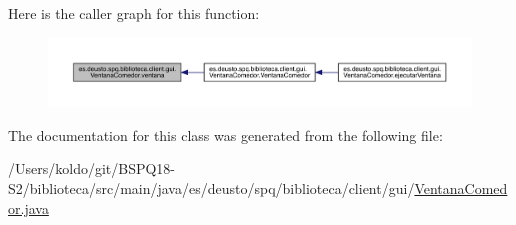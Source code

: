 Here is the caller graph for this function\+:
\nopagebreak
\begin{figure}[H]
\begin{center}
\leavevmode
\includegraphics[width=350pt]{classes_1_1deusto_1_1spq_1_1biblioteca_1_1client_1_1gui_1_1_ventana_comedor_a5fccdea48f9951fe483c0ace7ef475e0_icgraph}
\end{center}
\end{figure}


The documentation for this class was generated from the following file\+:\begin{DoxyCompactItemize}
\item 
/\+Users/koldo/git/\+B\+S\+P\+Q18-\/\+S2/biblioteca/src/main/java/es/deusto/spq/biblioteca/client/gui/\mbox{\hyperlink{_ventana_comedor_8java}{Ventana\+Comedor.\+java}}\end{DoxyCompactItemize}
